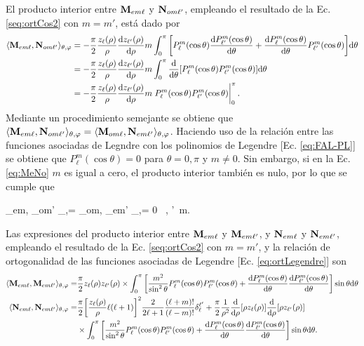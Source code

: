  El producto interior entre $\vb{M}_{em\ell}$ y $\vb{N}_{om\ell'}$, empleando el resultado de la Ec. \eqref{seq:ortCos2} con $m=m'$, está dado por
	\begin{align}
		\langle\vb{M}_{em\ell},  \vb{N}_{om\ell'} \rangle_{\theta,\varphi} &= - \frac{\pi}{2} \frac{z_\ell (\rho)}{\rho}\dv{z_{\ell'}(\rho)}{\rho}	m
							 \int_0^\pi\qty[P_\ell^m(\cos \theta )\dv{P_{\ell'}^m(\cos \theta )}{\theta}+ 
							  \dv{P_{\ell}^m(\cos \theta )}{\theta}P_{\ell'}^m(\cos \theta )] \dd\theta \notag\\
					 &=- \frac{\pi}{2} \frac{z_\ell (\rho)}{\rho}\dv{z_{\ell'}(\rho)}{\rho}	m 
					 	\int_0^\pi \dv{\theta}\qty[P_\ell^m(\cos\theta)P_{\ell'}^m(\cos\theta)]\dd\theta \notag\\
					 &=- \frac{\pi}{2} \frac{z_\ell (\rho)}{\rho}\dv{z_{\ell'}(\rho)}{\rho}	m \eval{P_\ell^m(\cos\theta)P_{\ell'}^m(\cos\theta)}_0^\pi.
					 	\label{eq:MeNo}
	\end{align}
Mediante un procedimiento semejante se obtiene que $\langle\vb{M}_{em\ell},  \vb{N}_{om\ell'} \rangle_{\theta,\varphi}=\langle\vb{M}_{om\ell},  \vb{N}_{em\ell'} \rangle_{\theta,\varphi}$. Haciendo uso de la relación entre las funciones asociadas de Legndre con los polinomios de Legendre [Ec. \eqref{eq:FAL-PL}] se obtiene que $P_\ell^m(\cos\theta)=0$ para $\theta=0,\pi$ y $m\neq 0$. Sin embargo, si en la Ec. \eqref{eq:MeNo} $m$ es igual a cero, el producto interior también es nulo, por lo que se cumple que 
	\begin{tcolorbox}
		\langle{}_{em\ell},  _{om\ell'} \rangle_{\theta,\varphi}=
		\langle{}_{om\ell},  _{em\ell'} \rangle_{\theta,\varphi}= 0	
		\qquad \forall\, \ell, \ell'\, m.
	\end{tcolorbox}
Las expresiones del  producto interior entre $\vb{M}_{em\ell}$ y $\vb{M}_{em\ell'}$, y $\vb{N}_{em\ell}$ y $\vb{N}_{em\ell'}$, empleando el resultado de la Ec. \eqref{seq:ortCos2} con $m=m'$, y la relación de ortogonalidad de las funciones asociadas de Legendre [Ec. \eqref{eq:ortLegendre}] son
	\begin{align*}
		\langle\vb{M}_{em\ell},  \vb{M}_{em\ell'} \rangle_{\theta,\varphi} =& 
				\frac{\pi}{2} z_\ell (\rho) z_{\ell'}(\rho)\times	 \int_0^\pi\qty[\frac{m^2}{\sin^2\theta}P_\ell^m(\cos\theta)P_{\ell'}^m(\cos\theta)
				 +\dv{P_\ell^m(\cos\theta)}{\theta}\dv{P_{\ell'}^m(\cos\theta)}{\theta}]\sin\theta\dd\theta\\
		\langle\vb{N}_{em\ell},  \vb{N}_{em\ell'} \rangle_{\theta,\varphi} =&
				\frac{\pi}{2} \qty[\frac{z_\ell(\rho)}{\rho}\ell(\ell+1)]^2\frac{2}{2\ell+1}\frac{(\ell+m)!}{(\ell-m)!}\delta_\ell^{\ell'}+
				\frac{\pi}{2} \frac{1}{\rho^2}\dv{\rho}\qty[\rho z_\ell (\rho)]\dv{\rho}\qty[\rho z_{\ell'}(\rho)]\\
				&\times \int_0^\pi\qty[\frac{m^2}{\sin^2\theta}P_\ell^m(\cos\theta)P_{\ell'}^m(\cos\theta)
					+\dv{P_\ell^m(\cos\theta)}{\theta}\dv{P_{\ell'}^m(\cos\theta)}{\theta}]\sin\theta\dd\theta.				 
	\end{align*}
